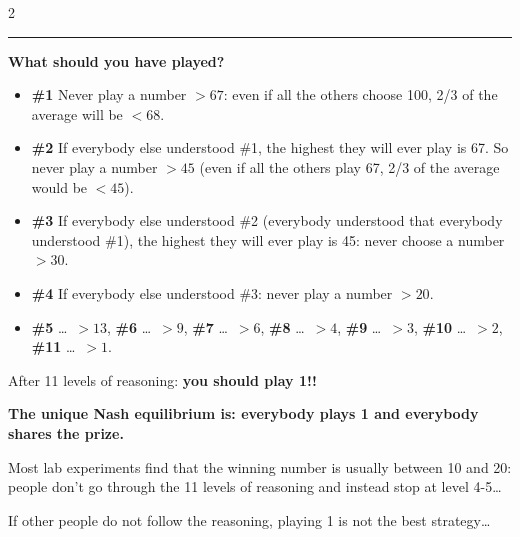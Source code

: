 \documentclass[a4paper,9pt]{extarticle}
\newcommand{\separator}{
\vspace{2pt}
\hrule
\vspace{3pt}
}
\begin{document}
\begin{multicols}{2}
\begin{example}
\end{example}


\separator


\textbf{What should you have played?}

\begin{itemize}

\item \textbf{\#1} Never play a number $> 67$: even if all the others choose 100, 2/3 of the
average will be $< 68$.

\item \textbf{\#2} If everybody else understood \#1, the highest they will ever play is 67.
So never play a number $> 45$ (even if all the others play 67, 2/3 of the average would be
$< 45$).

\item \textbf{\#3} If everybody else understood \#2 (everybody understood that everybody
understood \#1), the highest they will ever play is 45: never choose a number $> 30$.

\item \textbf{\#4} If everybody else understood \#3: never play a number $> 20$.

\item \textbf{\#5} \dots\ $> 13$, \textbf{\#6} \dots\ $> 9$, \textbf{\#7} \dots\ $> 6$,
\textbf{\#8} \dots\ $> 4$, \textbf{\#9} \dots\ $> 3$, \textbf{\#10} \dots\ $> 2$,
\textbf{\#11} \dots\ $> 1$.

\end{itemize}


\begin{important}

After 11 levels of reasoning: \textbf{you should play 1!!}

\textbf{The unique Nash equilibrium is: everybody plays 1 and everybody shares the prize.}

\end{important}


\begin{warning}

Most lab experiments find that the winning number is usually between 10 and 20: people don't
go through the 11 levels of reasoning and instead stop at level 4-5\dots

If other people do not follow the reasoning, playing 1 is not the best strategy\dots

\end{warning}




\end{multicols}
\end{document}
